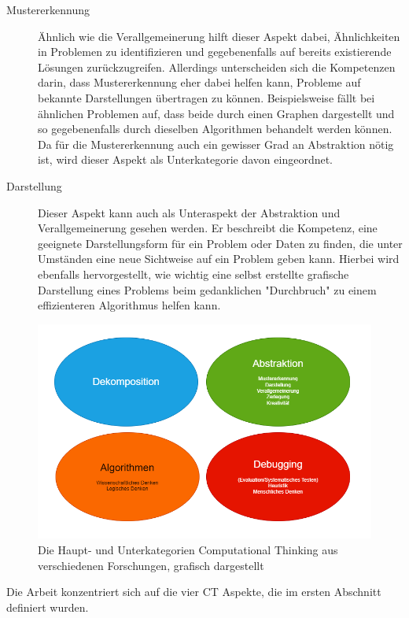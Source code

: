 \begin{description}
    \item[Mustererkennung] Ähnlich wie die Verallgemeinerung hilft dieser Aspekt dabei, Ähnlichkeiten in Problemen zu identifizieren und gegebenenfalls auf bereits existierende Lösungen zurückzugreifen. Allerdings unterscheiden sich die Kompetenzen darin, dass Mustererkennung eher dabei helfen kann, Probleme auf bekannte Darstellungen übertragen zu können. Beispielsweise fällt bei ähnlichen Problemen auf, dass beide durch einen Graphen dargestellt und so gegebenenfalls durch dieselben Algorithmen behandelt werden können. Da für die Mustererkennung auch ein gewisser Grad an Abstraktion nötig ist, wird dieser Aspekt als Unterkategorie davon eingeordnet.
    \item[Darstellung] Dieser Aspekt kann auch als Unteraspekt der Abstraktion und Verallgemeinerung gesehen werden. Er beschreibt die Kompetenz, eine geeignete Darstellungsform für ein Problem oder Daten zu finden, die unter Umständen eine neue Sichtweise auf ein Problem geben kann. Hierbei wird ebenfalls hervorgestellt, wie wichtig eine selbst erstellte grafische Darstellung eines Problems beim gedanklichen "Durchbruch" zu einem effizienteren Algorithmus helfen kann.
\end{description}

\begin{figure}[H]
    \centering
    \includegraphics[width=1\linewidth]{Figures/Section_2/CT}
    \caption{Die Haupt- und Unterkategorien Computational Thinking aus verschiedenen Forschungen, grafisch dargestellt}
\end{figure}

Die Arbeit konzentriert sich auf die vier CT Aspekte, die im ersten Abschnitt definiert wurden.

